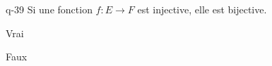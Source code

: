 \begin{truefalse}{q-39}
Si une fonction $f : E\to F$ est injective, elle est bijective.
\item Vrai
\item* Faux
\end{truefalse}

